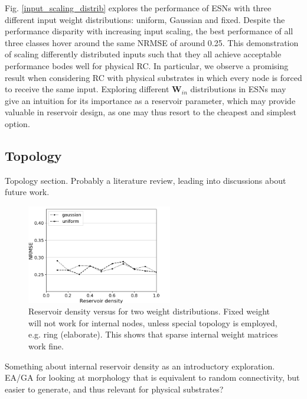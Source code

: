 Fig. \ref{input_scaling_distrib} explores the performance of ESNs with three
different input weight distributions: uniform, Gaussian and fixed. Despite the
performance disparity with increasing input scaling, the best performance of all
three classes hover around the same NRMSE of around 0.25. This demonstration of
scaling differently distributed inputs such that they all achieve acceptable
performance bodes well for physical RC. In particular, we observe a promising
result when considering RC with physical substrates in which every node is
forced to receive the same input. Exploring different $\mathbf{W}_{in}$
distributions in ESNs may give an intuition for its importance as a reservoir
parameter, which may provide valuable in reservoir design, as one may thus
resort to the cheapest and simplest option.



\subsection{Topology}

Topology section. Probably a literature review, leading into discussions about
future work.

\begin{figure}[H]
  \centering
  \includegraphics[width=2.5in]{img/reservoir_density_distrib.png}
  \caption{
    Reservoir density versus for two weight distributions. Fixed weight will not
work for internal nodes, unless special topology is employed, e.g. ring
(elaborate). This shows that sparse internal weight matrices work fine.
  }
  \label{reservoir_density_distrib}
\end{figure}

Something about internal reservoir density as an introductory exploration. EA/GA
for looking at morphology that is equivalent to random connectivity, but easier
to generate, and thus relevant for physical substrates?


